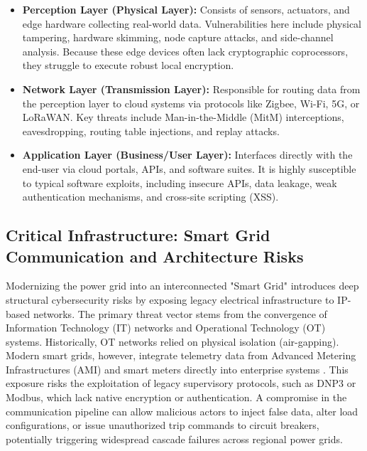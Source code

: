\documentclass[11pt,a4paper]{article}
\begin{document}
    \begin{itemize}
        \item \textbf{Perception Layer (Physical Layer):} Consists of sensors, actuators, and edge hardware collecting real-world data. Vulnerabilities here include physical tampering, hardware skimming, node capture attacks, and side-channel analysis. Because these edge devices often lack cryptographic coprocessors, they struggle to execute robust local encryption.

        \item \textbf{Network Layer (Transmission Layer):} Responsible for routing data from the perception layer to cloud systems via protocols like Zigbee, Wi-Fi, 5G, or LoRaWAN. Key threats include Man-in-the-Middle (MitM) interceptions, eavesdropping, routing table injections, and replay attacks.

        \item \textbf{Application Layer (Business/User Layer):} Interfaces directly with the end-user via cloud portals, APIs, and software suites. It is highly susceptible to typical software exploits, including insecure APIs, data leakage, weak authentication mechanisms, and cross-site scripting (XSS).
    \end{itemize}

\subsection{Critical Infrastructure: Smart Grid Communication and Architecture Risks}
Modernizing the power grid into an interconnected "Smart Grid" introduces deep structural cybersecurity risks by exposing legacy electrical infrastructure to IP-based networks. The primary threat vector stems from the convergence of Information Technology (IT) networks and Operational Technology (OT) systems. Historically, OT networks relied on physical isolation (air-gapping). Modern smart grids, however, integrate telemetry data from Advanced Metering Infrastructures (AMI) and smart meters directly into enterprise systems \cite{b2}. This exposure risks the exploitation of legacy supervisory protocols, such as DNP3 or Modbus, which lack native encryption or authentication. A compromise in the communication pipeline can allow malicious actors to inject false data, alter load configurations, or issue unauthorized trip commands to circuit breakers, potentially triggering widespread cascade failures across regional power grids.
\end{document}
